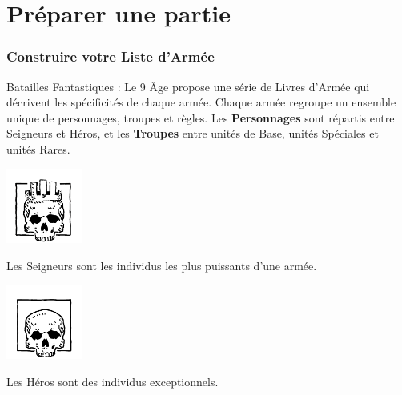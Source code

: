 
\part{Préparer une partie}

\section{Construire votre Liste d'Armée}
\label{building_an_army}

Batailles Fantastiques : Le 9\ieme{} Âge propose une série de Livres d'Armée qui décrivent les spécificités de chaque armée. Chaque armée regroupe un ensemble unique de personnages, troupes et règles. Les \textbf{Personnages} sont répartis entre Seigneurs et Héros, et les \textbf{Troupes} entre unités de Base, unités Spéciales et unités Rares.

\noindent\hspace*{\fill} \begin{minipage}[t]{0.3\textwidth}
\begin{center}\includegraphics[width=2.5cm]{../Layout/pics/logo_lord.png}

Les Seigneurs sont les individus les plus puissants d'une armée.
\end{center}
\end{minipage}\hspace*{1cm}
\begin{minipage}[t]{0.3\textwidth}
\begin{center}\includegraphics[width=2.5cm]{../Layout/pics/logo_hero.png}

Les Héros sont des individus exceptionnels.
\end{center}
\end{minipage}\hspace*{\fill}

